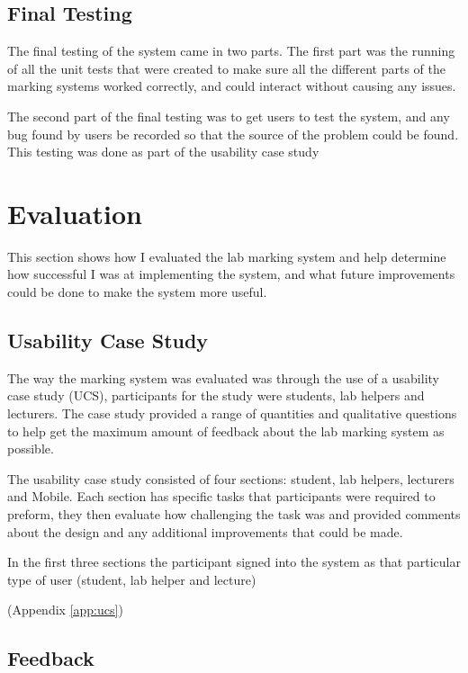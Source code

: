 \documentclass[12pt]{article}  %
\begin{document}
\subsection{Final Testing}

The final testing of the system came in two parts. The first part was the running of all the unit tests that were created to make sure all the different parts of the marking systems worked correctly, and could interact without causing any issues.

The second part of the final testing was to get users to test the system, and any bug found by users be recorded so that the source of the problem could be found. This testing was done as part of the usability case study 


\newpage
\section{Evaluation}

This section shows how I evaluated the lab marking system and help determine how successful I was at implementing the system, and what future improvements could be done to make the system more useful. 

\subsection{Usability Case Study}
The way the marking system was evaluated was through the use of a usability case study (UCS), participants for the study were students, lab helpers and lecturers. The case study provided a range of quantities and qualitative questions to help get the maximum amount of feedback about the lab marking system as possible. 


The usability case study consisted of four sections: student, lab helpers, lecturers and Mobile. Each section has specific tasks that participants were required to preform, they then evaluate how challenging the task was and provided comments about the design and any additional improvements that could be made. 

In the first three sections the participant signed into the system as that particular type of user (student, lab helper and lecture) 



(Appendix \ref{app:ucs})

\subsection{Feedback}
\end{document}
